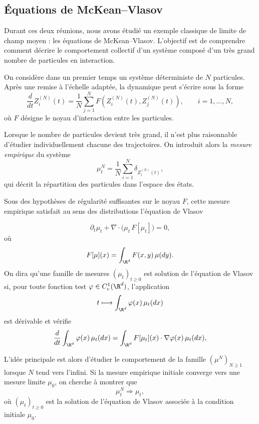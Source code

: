 \subsection{Équations de McKean--Vlasov}

Durant ces deux réunions, nous avons étudié un exemple classique de limite de champ moyen : les équations de McKean--Vlasov. L'objectif est de comprendre comment décrire le comportement collectif d'un système composé d'un très grand nombre de particules en interaction.

On considère dans un premier temps un système déterministe de $N$ particules. Après une remise à l'échelle adaptée, la dynamique peut s'écrire sous la forme
\begin{equation}
	\frac{d}{dt} Z_i^{(N)}(t)
	=
	\frac{1}{N}
	\sum_{j=1}^{N}
	F\!\left(
	Z_i^{(N)}(t),
	Z_j^{(N)}(t)
	\right),
	\qquad i=1,\dots,N,
	\label{eq:mean_field}
\end{equation}
où $F$ désigne le noyau d'interaction entre les particules.

Lorsque le nombre de particules devient très grand, il n'est plus raisonnable d'étudier individuellement chacune des trajectoires. On introduit alors la \emph{mesure empirique} du système
\[
	\mu_t^{N}
	=
	\frac1N
	\sum_{i=1}^{N}
	\delta_{Z_i^{(N)}(t)},
\]
qui décrit la répartition des particules dans l'espace des états.

Sous des hypothèses de régularité suffisantes sur le noyau $F$, cette mesure empirique satisfait au sens des distributions l'équation de Vlasov
\begin{important}
	\begin{equation}
		\partial_t \mu_t
		+
		\nabla \cdot
		\bigl(
		\mu_t\,F[\mu_t]
		\bigr)
		=
		0,
		\label{eq:vlasov}
	\end{equation}
	où
	\[
		F[\mu](x)
		=
		\int_{\R^d}
		F(x,y)\,\mu(dy).
	\]
	On dira qu'une famille de mesures $(\mu_t)_{t\geq0}$ est solution de l'équation de Vlasov si, pour toute fonction test $\varphi\in C_c^1(\R^d)$, l'application
	\[
		t\longmapsto \int_{\R^d}\varphi(x)\,\mu_t(dx)
	\]
	est dérivable et vérifie
	\[
		\frac{d}{dt}
		\int_{\R^d}
		\varphi(x)\,\mu_t(dx)
		=
		\int_{\R^d}
		F[\mu_t](x)\cdot \nabla\varphi(x)\,
		\mu_t(dx),
	\]
\end{important}


L'idée principale est alors d'étudier le comportement de la famille
$(\mu^N)_{N\geq 1}$ lorsque $N$ tend vers l'infini. Si la mesure empirique initiale converge vers une mesure limite $\mu_0$, on cherche à montrer que
\[
	\mu_t^N
	\Longrightarrow
	\mu_t,
\]
où $(\mu_t)_{t\geq0}$ est la solution de l'équation de Vlasov associée à la condition initiale $\mu_0$.


